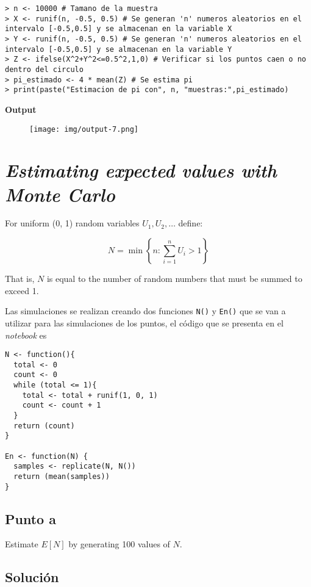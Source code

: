 \documentclass[12pt]{article}
\begin{document}
\begin{lstlisting}
> n <- 10000 # Tamano de la muestra
> X <- runif(n, -0.5, 0.5) # Se generan 'n' numeros aleatorios en el intervalo [-0.5,0.5] y se almacenan en la variable X
> Y <- runif(n, -0.5, 0.5) # Se generan 'n' numeros aleatorios en el intervalo [-0.5,0.5] y se almacenan en la variable Y
> Z <- ifelse(X^2+Y^2<=0.5^2,1,0) # Verificar si los puntos caen o no dentro del circulo
> pi_estimado <- 4 * mean(Z) # Se estima pi
> print(paste("Estimacion de pi con", n, "muestras:",pi_estimado)
\end{lstlisting}

\textbf{Output}


\begin{figure}[h]
    \centering
    \texttt{[image: img/output-7.png]}
\end{figure}

 

\section{\textit{Estimating expected values with Monte Carlo}}

For uniform (0, 1) random variables $U_{1}, U_{2}, \dots$ define:

\[
N = \min \left\{n : \sum_{i = 1}^{n} U_{i} > 1 \right\}
\]

That is, $N$ is equal to the number of random numbers that must be summed to exceed 1.


Las simulaciones se realizan creando dos funciones \texttt{N()} y \texttt{En()} que se van a utilizar para las simulaciones de los puntos, el código que se presenta en el \textit{notebook} es

\begin{lstlisting}
N <- function(){
  total <- 0
  count <- 0 
  while (total <= 1){
    total <- total + runif(1, 0, 1)
    count <- count + 1
  }
  return (count)
}

En <- function(N) { 
  samples <- replicate(N, N())
  return (mean(samples))
}
\end{lstlisting}


\subsection{Punto a}

Estimate $E[N]$ by generating 100 values of $N$.

\subsection{Solución}
\end{document}
